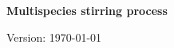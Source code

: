 \documentclass[11pt]{article}
\numberwithin{equation}{section}
\numberwithin{equation}{subsection}
\begin{document}
 
 
\begingroup
\begin{center}
 \begingroup\LARGE
\bf Multispecies stirring process
\par\endgroup
 \vspace{3.5em}
 \begingroup\large \bf
 \par\endgroup
\vspace{2em}

\begingroup\sffamily 
%  
\par\endgroup
\vspace{2em}

 Version: \today
\end{center}
%  

\thispagestyle{empty}

\begin{abstract}
\noindent
...
\end{abstract}


\tableofcontents

\end{document}
